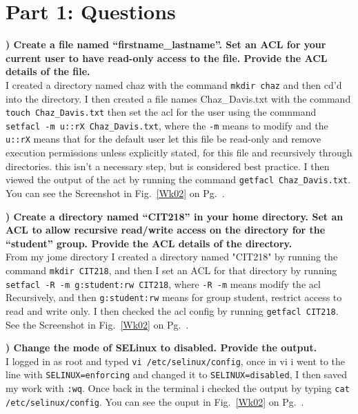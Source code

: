 \documentclass{report}
\title{\classinfo}
\author{\semester}
\date{\today}
\newcommand{\mysection}[1]{\section*{#1}}
\newcommand{\mysubsection}[2]{\textbf{\romannumeral #1) #2}}
\begin{document}
\maketitle

\mysection{\textbf{Part 1: Questions}}


\mysubsection{1}{Create a file named “firstname\_lastname”. Set an ACL for your current user to have read-only access to the file. Provide the ACL details of the file.}\\
I created a directory named chaz with the command 
{\scriptsize{\verb$mkdir chaz$}\normalsize} and then cd'd into the directory. 
I then created a file names Chaz\_Davis.txt with the command
{\scriptsize{\verb$touch Chaz_Davis.txt$}\normalsize} then set the acl for the
user using the comnmand
{\scriptsize{\verb$setfacl -m u::rX Chaz_Davis.txt$}\normalsize}, where the
{\scriptsize{\verb$-m$}\normalsize} means to modify and the
{\scriptsize{\verb$u::rX$}\normalsize} means that for the default user let this
file be read-only and remove execution permissions unless explicitly stated,
for this file and recursively through directories. this isn't a necessary step,
but is considered best practice. I then viewed the output of the act by running
the command {\scriptsize{\verb$getfacl Chaz_Davis.txt$}\normalsize}. You can
see the Screenshot in Fig.~\ref{Wk02} on Pg.~\pageref{Wk02}.


\noindent\mysubsection{2}{Create a directory named “CIT218” in your home directory. Set an ACL to allow recursive read/write access on the directory for the “student” group. Provide the ACL details of the directory.}\\
From my jome directory I created a directory named "CIT218" by running the
command {\scriptsize{\verb$mkdir CIT218$}\normalsize}, and then I set an ACL
for that directory by running 
{\scriptsize{\verb$setfacl -R -m g:student:rw CIT218$}\normalsize}, where
{\scriptsize{\verb$-R -m$}\normalsize} means modify the acl Recursively, and
then {\scriptsize{\verb$g:student:rw$}\normalsize} means for group student,
restrict access to read and write only. I then checked the acl config by
running {\scriptsize{\verb$getfacl CIT218$}\normalsize}. See the Screenshot in
Fig.~\ref{Wk02} on Pg.~\pageref{Wk02}.


\noindent\mysubsection{3}{Change the mode of SELinux to disabled. Provide the output.}\\
I logged in as root and typed 
{\scriptsize{\verb$vi /etc/selinux/config$}\normalsize}, once in vi i went to
the line with {\scriptsize{\verb$SELINUX=enforcing$}\normalsize} and changed it
to {\scriptsize{\verb$SELINUX=disabled$}\normalsize}, I then saved my work with
{\scriptsize{\verb$:wq$}\normalsize}. Once back in the terminal i checked the
output by typing {\scriptsize{\verb$cat /etc/selinux/config$}\normalsize}. You
can see the ouput in Fig.~\ref{Wk02} on Pg.~\pageref{Wk02}.
\end{document}
